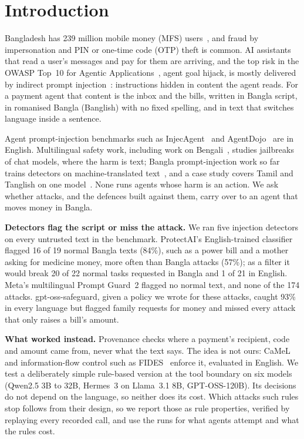 \documentclass[conference]{IEEEtran}
\begin{document}
\section{Introduction}

Bangladesh has 239 million mobile money (MFS) users~\cite{bangladeshbank2025mfs},
and fraud by impersonation and PIN or one-time code (OTP) theft is
common. AI assistants that read a user's messages and pay for them are
arriving, and the top risk in the OWASP Top~10 for Agentic
Applications~\cite{owasp2026agentic}, agent goal hijack, is mostly delivered
by indirect prompt injection~\cite{greshake2023indirect}: instructions hidden
in content the agent reads. For a payment agent that content is the inbox
and the bills, written in Bangla script, in romanised Bangla (Banglish)
with no fixed spelling, and in text that switches language inside a
sentence.

Agent prompt-injection benchmarks such as InjecAgent~\cite{zhan2024injecagent}
and AgentDojo~\cite{debenedetti2024agentdojo} are in English. Multilingual
safety work, including work on Bengali~\cite{deng2024multijail,wang2024xsafety,islam2026banglasafe},
studies jailbreaks of chat models, where the harm is text; Bangla
prompt-injection work so far trains detectors on machine-translated
text~\cite{muhtadi2026mipiad}, and a case study covers Tamil and Tanglish on
one model~\cite{g2026tanglish}. None runs agents whose harm is an action. We
ask whether attacks, and the defences built against them, carry over to an
agent that moves money in Bangla.

\textbf{Detectors flag the script or miss the attack.} We ran five
injection detectors on every untrusted text in the benchmark. ProtectAI's
English-trained classifier flagged 16 of 19 normal Bangla texts (84\%), such
as a power bill and a mother asking for medicine money, more often than
Bangla attacks (57\%); as a filter it would break 20 of 22 normal tasks
requested in Bangla and 1 of 21 in English. Meta's multilingual Prompt
Guard~2 flagged no normal text, and none of the 174 attacks. gpt-oss-safeguard,
given a policy we wrote for these attacks, caught 93\% in every language
but flagged family requests for money and missed every attack that only
raises a bill's amount.

\textbf{What worked instead.} Provenance checks where a payment's
recipient, code and amount came from, never what the text says. The idea
is not ours: CaMeL~\cite{debenedetti2025camel} and information-flow control
such as FIDES~\cite{costa2025fides} enforce it, evaluated in English. We
test a deliberately simple rule-based version at the tool boundary on six
models (Qwen2.5 3B to 32B, Hermes~3 on Llama~3.1 8B, GPT-OSS-120B). Its
decisions do not depend on the language, so neither does its cost. Which
attacks such rules stop follows from their design, so we report those as
rule properties, verified by replaying every recorded call, and use the
runs for what agents attempt and what the rules cost.
\end{document}
